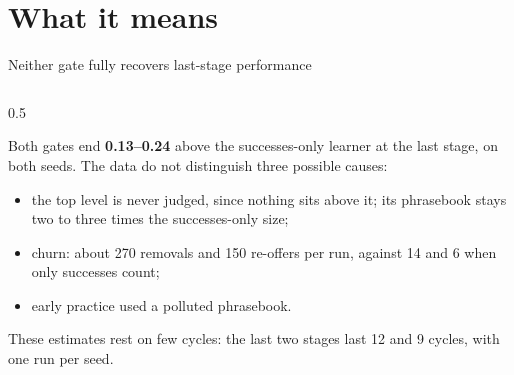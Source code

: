 \documentclass[aspectratio=169,11pt]{beamer}
\begin{document}
\section{What it means}

\begin{frame}{Neither gate fully recovers last-stage performance}
\begin{columns}[T]
\begin{column}{0.5\textwidth}
{\small Both gates end \textbf{0.13--0.24} above the successes-only learner at the last stage, on both seeds. The data do not distinguish three possible causes:\par}

{\footnotesize
\begin{itemize}\itemsep2pt
  \item the top level is never judged, since nothing sits above it; its phrasebook stays two to three times the successes-only size;
  \item churn: about 270 removals and 150 re-offers per run, against 14 and 6 when only successes count;
  \item early practice used a polluted phrasebook.
\end{itemize}}

\smallskip
{\footnotesize These estimates rest on few cycles: the last two stages last 12 and 9 cycles, with one run per seed.\par}
\end{column}


\end{columns}
\end{frame}
\end{document}
